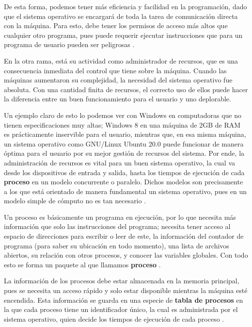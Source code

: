 \documentclass[letterpaper,12pt,oneside]{book}
\begin{document}
        De esta forma, podemos tener más 
		eficiencia y facilidad en la programación, dado que el sistema operativo se encargará de toda la tarea de comunicación directa con la máquina.
		Para esto, debe tener los permisos de acceso más altos que cualquier otro programa, pues puede requerir ejecutar instrucciones
		que para un programa de usuario pueden ser peligrosas \cite{tanenbaum_modern_2002}.

		En la otra rama, está su actividad como administrador de recursos, que es una consecuencia inmediata del control que tiene sobre la máquina.
		Cuando las máquinas aumentaron su complejidad, la necesidad del sistema operativo fue absoluta. Con una cantidad finita de recursos, el correcto
		uso de ellos puede hacer la diferencia entre un buen funcionamiento para el usuario y uno deplorable.
  
        Un ejemplo claro de esto lo podemos ver
		con Windows en computadoras que no tienen especificaciones muy altas; Windows 8 en una máquina de 2GB de RAM es prácticamente inservible para
		el usuario, mientras que, en esa misma máquina, un sistema operativo como GNU/Linux Ubuntu 20.0 puede funcionar de manera óptima para el usuario
		por su mejor gestión de recursos del sistema. Por ende, la administración de recursos es vital para un buen sistema operativo, la cual va
		desde los dispositivos de entrada y salida, hasta los tiempos de ejecución de cada \textbf{proceso} en un modelo concurrente o paralelo.
		Dichos modelos son precisamente a los que está orientado de manera fundamental un sistema operativo, pues en un modelo simple de cómputo no es 
		tan necesario \cite{tanenbaum_modern_2002}.
		
		Un proceso es básicamente un programa en ejecución, por lo que necesita más información que solo las instrucciones del programa; necesita
		tener acceso al espacio de direcciones para escribir o leer de este, la información del contador de programa
		(para saber su ubicación en todo momento), una lista de archivos abiertos, su relación con otros procesos, y conocer las variables globales. Con todo esto se forma un paquete al que llamamos \textbf{proceso} \cite{tanenbaum_modern_2002}.
  
        La información de los procesos
		debe estar almacenada en la memoria principal, pues se necesita un acceso rápido y solo estar disponible mientras la máquina esté encendida. Esta
		información se guarda en una especie de \textbf{tabla de procesos} en la que cada proceso tiene un identificador único, la cual es administrada 
		por el sistema operativo, quien decide los tiempos de ejecución de cada proceso \cite{tanenbaum_modern_2002}.
		
\end{document}
